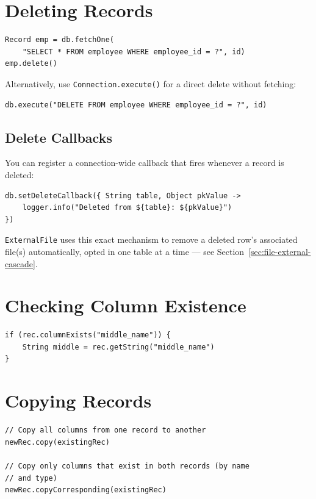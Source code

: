 \section{Deleting Records}
\label{sec:crud-delete}

\begin{lstlisting}[style=groovy]
Record emp = db.fetchOne(
    "SELECT * FROM employee WHERE employee_id = ?", id)
emp.delete()
\end{lstlisting}

\noindent
Alternatively, use \texttt{Connection.execute()} for a direct delete without fetching:

\begin{lstlisting}[style=groovy]
db.execute("DELETE FROM employee WHERE employee_id = ?", id)
\end{lstlisting}

\subsection{Delete Callbacks}

You can register a connection-wide callback that fires whenever a record is deleted:

\begin{lstlisting}[style=groovy]
db.setDeleteCallback({ String table, Object pkValue ->
    logger.info("Deleted from ${table}: ${pkValue}")
})
\end{lstlisting}

\noindent
\texttt{ExternalFile} uses this exact mechanism to remove a deleted row's associated file(s) automatically, opted in one table at a time --- see Section~\ref{sec:file-external-cascade}.

\section{Checking Column Existence}
\label{sec:crud-colexist}

\begin{lstlisting}[style=groovy]
if (rec.columnExists("middle_name")) {
    String middle = rec.getString("middle_name")
}
\end{lstlisting}

\section{Copying Records}
\label{sec:crud-copy}

\begin{lstlisting}[style=groovy]
// Copy all columns from one record to another
newRec.copy(existingRec)

// Copy only columns that exist in both records (by name
// and type)
newRec.copyCorresponding(existingRec)
\end{lstlisting}

